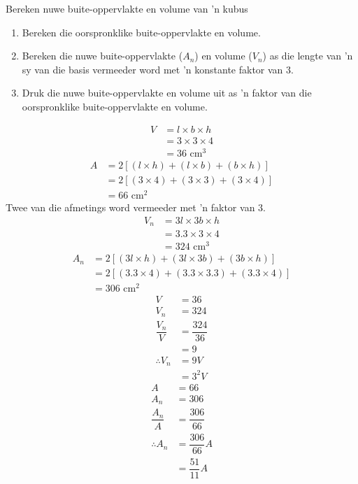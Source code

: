 \begin{wex}{Bereken nuwe buite-oppervlakte en volume van 'n kubus}
{\begin{minipage}{\textwidth}
\begin{enumerate}[noitemsep, label=\textbf{\arabic*}. ] 
 \item Bereken die oorspronklike buite-oppervlakte en volume.
\item Bereken die nuwe buite-oppervlakte ($A_n$) en volume ($V_n$) as die lengte van 'n sy van die basis vermeeder word met 'n konstante faktor van $3$.
\item Druk die nuwe buite-oppervlakte en volume uit as 'n faktor van die oorspronklike buite-oppervlakte en volume.
\end{enumerate}
\end{minipage}
}
{
\begin{align*}
V&=l\times b\times h\\
&=3\times3\times4\\
&= 36\mbox{ cm}^3
\end{align*}
\begin{align*}
A &= 2[(l \times h) + (l \times b) + (b \times h)]\\
&= 2[(3 \times 4) + (3 \times 3) + (3 \times 4)]\\
&= 66 \mbox{ cm}^2
\end{align*}
Twee van die afmetings word vermeeder met 'n faktor van $3$.
\begin{align*}
V_n&=3l\times 3b \times h\\
&=3.3\times3\times4\\
&= 324\mbox{ cm}^3
\end{align*}
\begin{align*}
A_n &= 2[(3l \times h) + (3l \times 3b) + (3b \times h)]\\
&= 2[(3.3 \times 4) + (3.3 \times 3.3) + (3.3 \times 4)]\\
&= 306 \mbox{ cm}^2
\end{align*}
\begin{align*}
V&=36\\
V_n&= 324\\
\dfrac{V_n}{V} &=\dfrac{324}{36}\\
&=9\\
\therefore V_n&=9V\\
&=3^2 V
\end{align*}
\begin{align*}
A &= 66 \\
A_n&= 306\\
\dfrac{A_n}{A} &=\dfrac{306}{66}\\
\therefore A_n&= \dfrac{306}{66}A\\
&=\dfrac{51}{11}A\\

\end{align*}
}
\end{wex}

